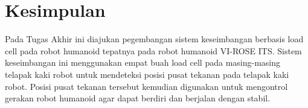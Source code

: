 \section{Kesimpulan}
\label{sec:kesimpulan}

Pada Tugas Akhir ini diajukan pegembangan sistem keseimbangan berbasis load cell pada robot humanoid tepatnya pada robot humanoid VI-ROSE ITS. Sistem keseimbangan ini menggunakan empat buah load cell pada masing-masing telapak kaki robot untuk mendeteksi posisi pusat tekanan pada telapak kaki robot. Posisi pusat tekanan tersebut kemudian digunakan untuk mengontrol gerakan robot humanoid agar dapat berdiri dan berjalan dengan stabil.